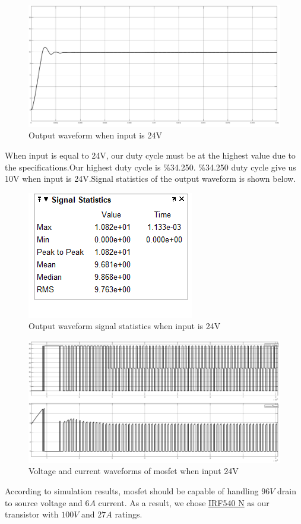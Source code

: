 \documentclass{article}
\newcommand\tab[1][1cm]{\hspace*{#1}}
\begin{document}
\begin{figure}[H]
    \centering
    \includegraphics[scale=0.3]{24in.png}
    \caption{Output waveform when input is 24V}
    \label{fig:my_label}
\end{figure}
\tab When input is equal to 24V, our duty cycle must be at the highest value due to the specifications.Our highest duty cycle is $\%$34.250. $\%$34.250 duty cycle give us 10V when input is 24V.Signal statistics of the output waveform is shown below.
\begin{figure}[H]
    \centering
    \includegraphics[scale=0.9]{24sinyal.PNG}
    \caption{Output waveform signal statistics when input is 24V}
    \label{fig:my_label}
\end{figure}
\begin{figure}[H]
    \centering
    \includegraphics[scale=0.3]{mosfet2.png}
    \caption{Voltage and current waveforms of mosfet when input 24V}
    \label{fig:my_label}
\end{figure}
\tab According to simulation results, mosfet should be capable of handling $96 V$ drain to source voltage and $6 A$ current. As a result, we chose  \href{https://pdf.direnc.net/upload/irf540nspbf-datasheet.pdf}{IRF540 N} as our transistor with $100 V$ and $27 A$ ratings.
\end{document}
